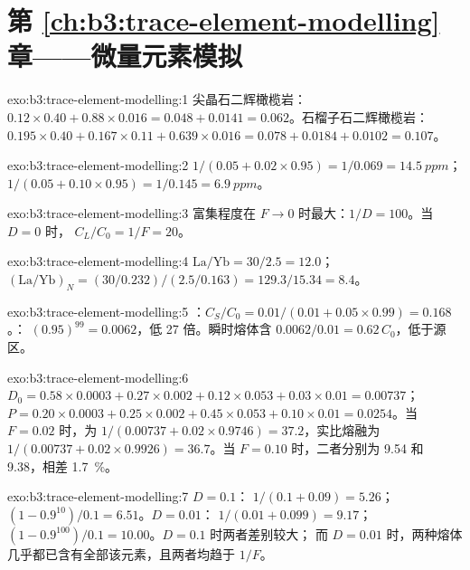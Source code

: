 \section*{第 \ref{ch:b3:trace-element-modelling} 章——微量元素模拟}

\begin{solution}{exo:b3:trace-element-modelling:1}
尖晶石二辉橄榄岩：$0.12\times0.40 + 0.88\times0.016 = 0.048 + 0.0141 =
0.062$。石榴子石二辉橄榄岩：$0.195\times0.40 + 0.167\times0.11 +
0.639\times0.016 = 0.078 + 0.0184 + 0.0102 = 0.107$。
\end{solution}

\begin{solution}{exo:b3:trace-element-modelling:2}
$1/(0.05 + 0.02\times0.95) = 1/0.069 = \qty{14.5}{ppm}$；
$1/(0.05 + 0.10\times0.95) = 1/0.145 = \qty{6.9}{ppm}$。
\end{solution}

\begin{solution}{exo:b3:trace-element-modelling:3}
富集程度在 $F \to 0$ 时最大：$1/D = 100$。当 $D = 0$ 时，
$C_L/C_0 = 1/F = 20$。
\end{solution}

\begin{solution}{exo:b3:trace-element-modelling:4}
$\mathrm{La/Yb} = 30/2.5 = 12.0$；$(\mathrm{La}/\mathrm{Yb})_N =
(30/0.232)/(2.5/0.163) = 129.3/15.34 = 8.4$。
\end{solution}

\begin{solution}{exo:b3:trace-element-modelling:5}
：$C_S/C_0 = 0.01/(0.01 + 0.05\times0.99) = 0.168$。：
$(0.95)^{99} = 0.0062$，低 27 倍。瞬时熔体含
$0.0062/0.01 = 0.62\,C_0$，低于源区。
\end{solution}

\begin{solution}{exo:b3:trace-element-modelling:6}
$D_0 = 0.58\times0.0003 + 0.27\times0.002 + 0.12\times0.053 + 0.03\times0.01
= 0.00737$；$P = 0.20\times0.0003 + 0.25\times0.002 + 0.45\times0.053 +
0.10\times0.01 = 0.0254$。当 $F = 0.02$ 时，为 $1/(0.00737 +
0.02\times0.9746) = 37.2$，实比熔融为 $1/(0.00737 + 0.02\times0.9926) = 36.7$。当
$F = 0.10$ 时，二者分别为 9.54 和 9.38，相差 \qty{1.7}{\percent}。
\end{solution}

\begin{solution}{exo:b3:trace-element-modelling:7}
$D = 0.1$： $1/(0.1 + 0.09) = 5.26$； $(1 - 0.9^{10})/0.1 =
6.51$。$D = 0.01$： $1/(0.01 + 0.099) = 9.17$；
$(1 - 0.9^{100})/0.1 = 10.00$。$D = 0.1$ 时两者差别较大；
而 $D = 0.01$ 时，两种熔体几乎都已含有全部该元素，且两者均趋于
$1/F$。
\end{solution}

